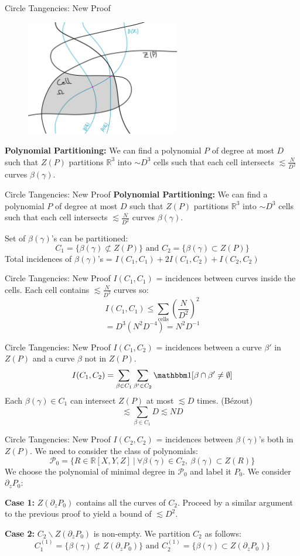 \documentclass{beamer}
\newcommand{\OO}{\mathbbm 1}
\newcommand{\RR}{\mathbb R}
\newcommand{\nfr}[1]{\begin{frame} #1
\end{frame}}
\begin{document}
\nfr{{Circle Tangencies: New Proof }
\begin{figure}[h]
    \centering
    \includegraphics[width=0.6\textwidth]{images/new_proof_c.png}
\end{figure}
\textbf{Polynomial Partitioning:} We can find a polynomial $P$ of degree at most $D$ such that $Z(P)$ partitions $\RR^3$ into $\sim D^3$ cells such that each cell intersects $\lesssim \frac{N}{D^2}$ curves $\beta(\gamma)$.
}

\nfr{{Circle Tangencies: New Proof }
\textbf{Polynomial Partitioning:} We can find a polynomial $P$ of degree at most $D$ such that $Z(P)$ partitions $\RR^3$ into $\sim D^3$ cells such that each cell intersects $\lesssim \frac{N}{D^2}$ curves $\beta(\gamma)$.


Set of $\beta(\gamma)$'s can be partitioned:
\[
   C_1 = \{\beta(\gamma) \not \subset Z(P) \} \text{ and } C_2 = \{\beta(\gamma) \subset Z(P) \} 
\]
Total incidences of $\beta(\gamma)$'s = $I(C_1,C_1) +2I(C_1,C_2) + I(C_2,C_2)$  
}
\nfr{{Circle Tangencies: New Proof }
$I(C_1,C_1)$ = incidences between curves inside the cells. Each cell contains $\lesssim \frac{N}{D^2}$ curves so:
\[
  I(C_1,C_1) \leq \sum_{\text{cells}} \left(\frac{N}{D^2} \right)^2 
\]
\[
 = D^3 (N^2 D^{-4}) = N^2D^{-1}
\]
}

\nfr{{Circle Tangencies: New Proof }
$I(C_1,C_2)$ = incidences between a curve $\beta'$ in $Z(P)$ and a curve $\beta$ not in $Z(P)$.
\[
    I(C_1,C_2) = \sum_{\beta \in C_1} \sum_{\beta' \in C_2} \OO[\beta \cap \beta' \neq \emptyset]
\]
Each $\beta(\gamma) \in C_1$ can intersect $Z(P)$ at most $\lesssim D$ times. (Bézout)
\[
\lesssim  \sum_{\beta \in C_1} D \lesssim ND
\]
}

\nfr{{Circle Tangencies: New Proof }
$I(C_2,C_2)$ = incidences between $\beta(\gamma)$'s both in $Z(P)$. 
We need to consider the class of polynomials:
\[
\mathcal{P}_0 = \{R \in \RR[X,Y,Z] \ | \ \forall \beta(\gamma) \in C_2,\ \beta(\gamma) \subset Z(R) \}
\]
We choose the polynomial of minimal degree in $\mathcal P_0$ and label it $P_0$.
We consider $\partial_z P_0$:

\textbf{Case 1:} $Z(\partial_z P_0)$ contains all the curves of $C_2$. Proceed by a similar argument to the previous proof to yield a bound of $\lesssim D^2$.

\pause
\textbf{Case 2:} $C_2 \backslash Z(\partial_z P_0)$ is non-empty. We partition $C_2$ as follows:
\[
   C_1^{(1)} = \{\beta(\gamma) \not \subset Z(\partial_z P_0) \} \text{ and } C_2^{(1)} = \{\beta(\gamma) \subset Z(\partial_z P_0) \} 
\]


}
\end{document}
